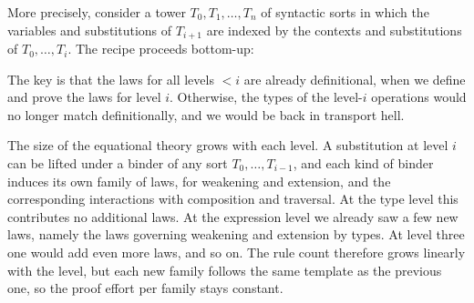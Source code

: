 \documentclass[manuscript,screen,review,anonymous,acmsmall]{acmart}
\begin{document}
More precisely, consider a tower $T_0, T_1, \dots, T_n$ of syntactic
sorts in which the variables and substitutions of $T_{i+1}$ are
indexed by the contexts and substitutions of $T_0, \dots, T_i$. The
recipe proceeds bottom-up:
\begin{quote}
\noindent{}
\end{quote}
The key is that the laws for all levels $<i$ are already definitional,
when we define and prove the laws for level $i$.
Otherwise, the types of the level-$i$ operations would no longer
match definitionally, and we would be back in transport hell. 

The size of the equational theory grows with each level. A
substitution at level $i$ can be lifted under a binder of any sort
$T_0, \dots, T_{i-1}$, and each kind of binder induces its own
family of laws, for weakening and extension, and the
corresponding interactions with composition and traversal. At the
type level this contributes no additional laws. At the expression
level we already saw a few new laws, namely the laws governing
weakening and extension by types. At level three one would add
even more laws, and so on. The rule count therefore grows
linearly with the level, but each new family follows the same
template as the previous one, so the proof effort per family stays
constant.
\end{document}
